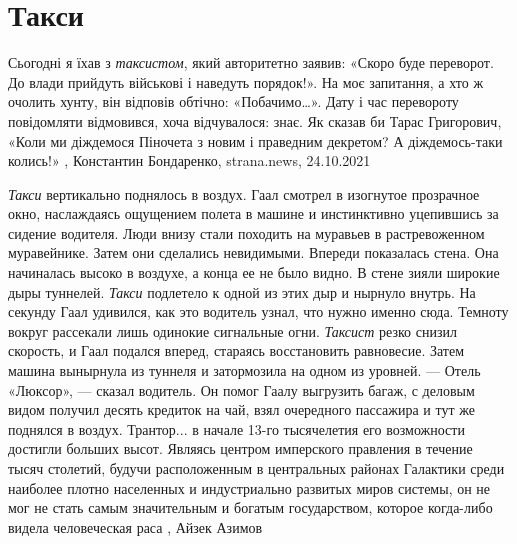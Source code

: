 
 
 
 
 

\chapter{Такси}
\label{sec:slova.taksi}

Сьогодні я їхав з \emph{таксистом}, який авторитетно заявив: «Скоро буде
переворот. До влади прийдуть військові і наведуть порядок!». На моє запитання,
а хто ж очолить хунту, він відповів обтічно: «Побачимо…». Дату і час перевороту
повідомляти відмовився, хоча відчувалося: знає.  Як сказав би Тарас Григорович,
«Коли ми діждемося Піночета з новим і праведним декретом? А діждемось-таки
колись!»
, 
Константин Бондаренко, strana.news, 24.10.2021

\emph{Такси} вертикально поднялось в воздух. Гаал смотрел в изогнутое
прозрачное окно, наслаждаясь ощущением полета в машине и инстинктивно
уцепившись за сидение водителя. Люди внизу стали походить на муравьев в
растревоженном муравейнике.  Затем они сделались невидимыми.  Впереди
показалась стена. Она начиналась высоко в воздухе, а конца ее не было видно. В
стене зияли широкие дыры туннелей. \emph{Такси} подлетело к одной из этих дыр и
нырнуло внутрь. На секунду Гаал удивился, как это водитель узнал, что нужно
именно сюда. Темноту вокруг рассекали лишь одинокие сигнальные огни.
\emph{Таксист} резко снизил скорость, и Гаал подался вперед, стараясь
восстановить равновесие. Затем машина вынырнула из туннеля и затормозила на
одном из уровней.  — Отель «Люксор», — сказал водитель.  Он помог Гаалу
выгрузить багаж, с деловым видом получил десять кредиток на чай, взял
очередного пассажира и тут же поднялся в воздух.  Трантор... в начале 13-го
тысячелетия его возможности достигли больших высот. Являясь центром имперского
правления в течение тысяч столетий, будучи расположенным в центральных районах
Галактики среди наиболее плотно населенных и индустриально развитых миров
системы, он не мог не стать самым значительным и богатым государством, которое
когда-либо видела человеческая раса
, Айзек Азимов
